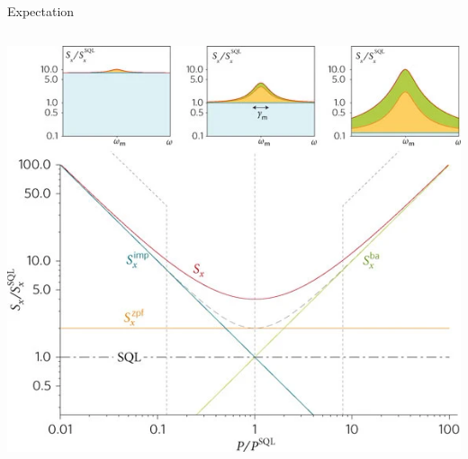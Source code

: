\documentclass{beamer}
\begin{document}
\begin{frame}{Expectation}
	\begin{columns}

		

		\centering
		\includegraphics[width=\textwidth]{figures/Fig 1.png}


\end{columns}
\end{frame}
\end{document}
